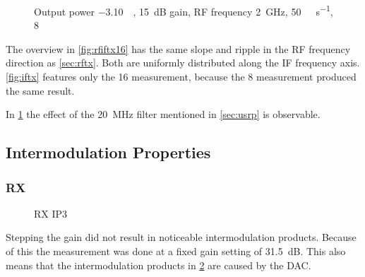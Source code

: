 \documentclass[12pt,a4paper,parskip=full,abstracton]{scrartcl}
\begin{document}
\begin{figure}[htb]
    \centering
{}
    \caption{Output power \SI{-3.10}{\deci\belfs}, \SI{15}{\deci\bel} gain, RF frequency \SI{2}{\giga\hertz}, \SI{50}{\mega\samples\per\second}, \SI{8}{\bit}}
    \label{fig:iftx50}
\end{figure}
The overview in \cref{fig:rfiftx16} has the same slope and ripple
in the RF frequency direction as \cref{sec:rftx}. Both are uniformly
distributed along the IF frequency axis. \cref{fig:iftx} features only the \SI{16}{\bit}
measurement, because the \SI{8}{\bit} measurement produced the same result.

In \ref{fig:iftx50} the effect of the \SI{20}{\mega\hertz} filter mentioned in \cref{sec:usrp} is
observable.

\clearpage
\subsection{Intermodulation Properties}
\subsubsection{RX}
\begin{figure}[htb]
    \centering
{}
    \caption{RX IP3}
    \label{fig:rxip3}
\end{figure}
Stepping the gain did not result in noticeable intermodulation products.
Because of this the measurement was done at a fixed gain setting of
\SI{31.5}{\deci\bel}. This also means that the intermodulation products
in \cref{fig:rxip3} are caused by the DAC.
\end{document}
